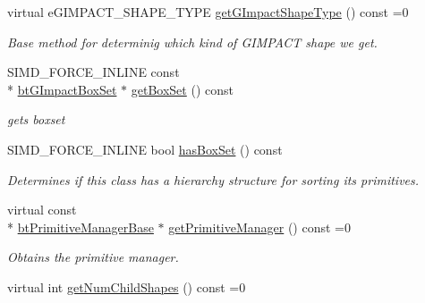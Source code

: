 \begin{DoxyCompactItemize}
\item 
virtual e\+G\+I\+M\+P\+A\+C\+T\+\_\+\+S\+H\+A\+P\+E\+\_\+\+T\+Y\+P\+E \hyperlink{classbt_g_impact_shape_interface_a25cacbe448997e3f8ec99cb2d4952859}{get\+G\+Impact\+Shape\+Type} () const =0
\begin{DoxyCompactList}\small\item\em Base method for determinig which kind of G\+I\+M\+P\+A\+C\+T shape we get. \end{DoxyCompactList}\item 
\hypertarget{classbt_g_impact_shape_interface_af790f5e01743f08a141b4ee9721cba43}{S\+I\+M\+D\+\_\+\+F\+O\+R\+C\+E\+\_\+\+I\+N\+L\+I\+N\+E const \\*
\hyperlink{bt_g_impact_shape_8h_a9fcdf1a76bb3d1affed81432e4e4ab68}{bt\+G\+Impact\+Box\+Set} $\ast$ \hyperlink{classbt_g_impact_shape_interface_af790f5e01743f08a141b4ee9721cba43}{get\+Box\+Set} () const }\label{classbt_g_impact_shape_interface_af790f5e01743f08a141b4ee9721cba43}

\begin{DoxyCompactList}\small\item\em gets boxset \end{DoxyCompactList}\item 
\hypertarget{classbt_g_impact_shape_interface_a042a632b8e87f0fe3c2294b9ab8457c6}{S\+I\+M\+D\+\_\+\+F\+O\+R\+C\+E\+\_\+\+I\+N\+L\+I\+N\+E bool \hyperlink{classbt_g_impact_shape_interface_a042a632b8e87f0fe3c2294b9ab8457c6}{has\+Box\+Set} () const }\label{classbt_g_impact_shape_interface_a042a632b8e87f0fe3c2294b9ab8457c6}

\begin{DoxyCompactList}\small\item\em Determines if this class has a hierarchy structure for sorting its primitives. \end{DoxyCompactList}\item 
\hypertarget{classbt_g_impact_shape_interface_a291328e80a5f22cffc50924ebb90040a}{virtual const \\*
\hyperlink{classbt_primitive_manager_base}{bt\+Primitive\+Manager\+Base} $\ast$ \hyperlink{classbt_g_impact_shape_interface_a291328e80a5f22cffc50924ebb90040a}{get\+Primitive\+Manager} () const =0}\label{classbt_g_impact_shape_interface_a291328e80a5f22cffc50924ebb90040a}

\begin{DoxyCompactList}\small\item\em Obtains the primitive manager. \end{DoxyCompactList}\item 
\hypertarget{classbt_g_impact_shape_interface_aa145ed4669ce202e97d1a9e1081b3560}{virtual int \hyperlink{classbt_g_impact_shape_interface_aa145ed4669ce202e97d1a9e1081b3560}{get\+Num\+Child\+Shapes} () const =0}\label{classbt_g_impact_shape_interface_aa145ed4669ce202e97d1a9e1081b3560}


\end{DoxyCompactItemize}
